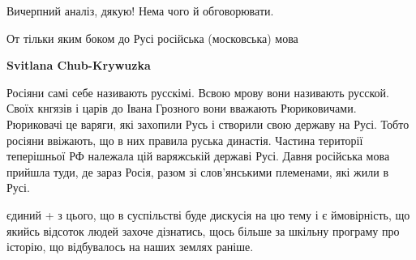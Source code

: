 \begin{itemize}
 
Вичерпний аналіз, дякую!
Нема чого й обговорювати.

 
От тільки яким боком до Русі російська (московська) мова

\begin{itemize} %
 
\textbf{Svitlana Chub-Krywuzka} 

Росіяни самі себе називають русскімі. Всвою
мрову вони називають русской. Своїх кнгязів і царів до Івана Грозного вони
вважають Рюриковичами. Рюриковачі це варяги, які захопили Русь і створили свою
державу на Русі. Тобто росіяни ввіжають, що в них правила руська династія.
Частина території теперішньої РФ належала цій варяжській державі Русі. Давня
російська мова прийшла туди, де зараз Росія, разом зі слов'янськими племенами,
які жили в Русі.
\end{itemize} %

 

єдиний + з цього, що в суспільстві буде дискусія на цю тему і є ймовірність, що
якийсь відсоток людей захоче дізнатись, щось більше за шкільну програму про
історію, що відбувалось на наших землях раніше.



\end{itemize}
